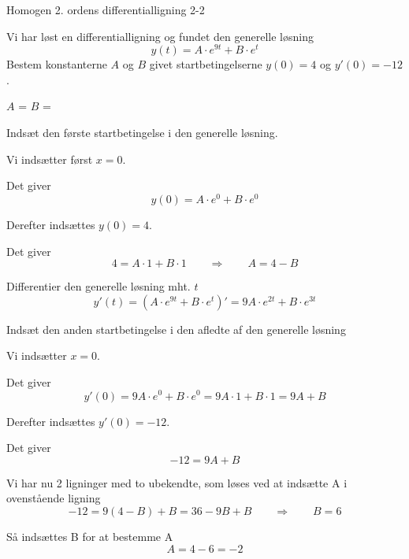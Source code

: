 \documentclass{article}
\begin{document}
\begin{exercise}{Homogen 2. ordens differentialligning 2-2}
	
	Vi har løst en differentialligning og fundet den generelle løsning
	\[
	y(t) = A \cdot e^{9t} + B \cdot e^{t}
	\]
	Bestem konstanterne $A$ og $B$ givet startbetingelserne $y(0)=4$ og $y'(0)=-12$.
	
	
	$A$ = 		
$B$ = 
	
	\hint
	
	Indsæt den første startbetingelse i den generelle løsning. 
	
	
	\hint
	
	Vi indsætter først $x=0$.
	
	\hint
	
	Det giver
	\[
	y(0)=  A \cdot e^{0} + B \cdot e^{0}
	\]
	
	\hint
	
	Derefter indsættes $y(0)=4$.
	
	\hint 
	
	Det giver 
	\[
	4= A \cdot 1 + B \cdot 1 \qquad \Rightarrow \qquad A = 4 - B
	\]
	
	\hint 
	
	Differentier den generelle løsning mht. $t$
	\[
	y'(t)= \left(A \cdot e^{9t} + B \cdot e^{t} \right)' = 9A \cdot e^{2t} + B \cdot e^{3t} 
	\]
	
	\hint 
	
	Indsæt den anden startbetingelse i den afledte af den generelle løsning
	
	\hint
	
	Vi indsætter $x=0$.
	
	\hint 
	
	Det giver
	\[
	y'(0) = 9A \cdot e^{0} + B \cdot e^{0} =  9A \cdot 1 + B \cdot 1  = 9A + B
	\]
	
	\hint 
	
	Derefter indsættes $y'(0)=-12$.	
	\hint
	
	Det giver
	\[
	-12 = 9A+ B 
	\]
	
	\hint 
	
	Vi har nu 2 ligninger med to ubekendte, som løses ved at indsætte A i ovenstående ligning
	\[
	-12 = 9(4-B) + B = 36 - 9B + B \qquad \Rightarrow \qquad B = 6
	\]
	
	\hint
	
	Så indsættes B for at bestemme A
	\[
	A = 4 - 6 = -2
	\]
	
\end{exercise}


\newpage
\end{document}
